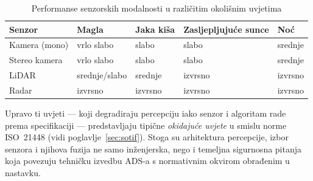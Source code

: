 \begin{table}[H]
\centering
\caption{Performanse senzorskih modalnosti u različitim okolišnim uvjetima}
\label{tab:senzori-uvjeti}
\begin{tabularx}{\textwidth}{l X X X X}
\toprule
\textbf{Senzor} & \textbf{Magla} & \textbf{Jaka kiša} & \textbf{Zasljepljujuće sunce} & \textbf{Noć} \\
\midrule
Kamera (mono) & vrlo slabo & slabo & slabo & srednje \\
\addlinespace
Stereo kamera & vrlo slabo & slabo & slabo & srednje \\
\addlinespace
LiDAR & srednje/slabo & srednje & izvrsno & izvrsno \\
\addlinespace
Radar & izvrsno & izvrsno & izvrsno & izvrsno \\
\bottomrule
\end{tabularx}
\end{table}

Upravo ti uvjeti — koji degradiraju percepciju iako senzor i algoritam rade prema specifikaciji — predstavljaju tipične \textit{okidajuće uvjete} u smislu norme ISO~21448 (vidi poglavlje~\ref{sec:sotif}). Stoga su arhitektura percepcije, izbor senzora i njihova fuzija ne samo inženjerska, nego i temeljna sigurnosna pitanja koja povezuju tehničku izvedbu ADS-a s normativnim okvirom obrađenim u nastavku.
